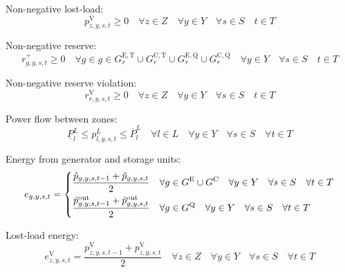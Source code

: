 \documentclass{article}
\newcommand{\sGeneratorsExisting}{G^{\mathrm{E}}}
\newcommand{\sGeneratorsExistingThermal}{G^{\mathrm{E,T}}}
\newcommand{\sGeneratorsCandidate}{G^{\mathrm{C}}}
\newcommand{\sGeneratorsCandidateThermal}{G^{\mathrm{C,T}}}
\newcommand{\sStorage}{G^{\mathrm{Q}}}
\newcommand{\sStorageExisting}{G^{\mathrm{E,Q}}}
\newcommand{\sStorageCandidate}{G^{\mathrm{C,Q}}}
\newcommand{\sYears}{Y}
\newcommand{\sScenarios}{S}
\newcommand{\sIntervals}{T}
\newcommand{\sZones}{Z}
\newcommand{\sLinks}{L}
\newcommand{\iGenerator}{g}
\newcommand{\iYear}{y}
\newcommand{\iScenario}{s}
\newcommand{\iInterval}{t}
\newcommand{\iZone}{z}
\newcommand{\iRegion}{r}
\newcommand{\iLink}{l}
\newcommand{\cPowerFlowMin}{\underline{P}_{\iLink}^{L}}
\newcommand{\cPowerFlowMax}{\overline{P}_{\iLink}^{L}}
\newcommand{\vEnergy}[1][\iGenerator,\iYear,\iScenario,\iInterval]{e_{#1}}
\newcommand{\vReserveUp}[1][\iGenerator,\iYear,\iScenario,\iInterval]{r^{+}_{#1}}
\newcommand{\vReserveUpViolation}[1][\iRegion,\iYear,\iScenario,\iInterval]{r^{\mathrm{V}}_{#1}}
\newcommand{\vPowerTotal}[1][\iGenerator,\iYear,\iScenario,\iInterval]{\hat{p}_{#1}}
\newcommand{\vPowerTotalOut}[1][\iGenerator,\iYear,\iScenario,\iInterval]{\hat{p}^{\mathrm{out}}_{#1}}
\newcommand{\vPowerFlow}[1][\iLink,\iYear,\iScenario,\iInterval]{p^{\sLinks}_{#1}}
\newcommand{\vLostLoadEnergy}[1][\iZone,\iYear,\iScenario,\iInterval]{e^{\mathrm{V}}_{#1}}
\newcommand{\vLostLoadPower}[1][\iZone,\iYear,\iScenario,\iInterval]{p^{\mathrm{V}}_{#1}}
\begin{document}
Non-negative lost-load:
\begin{equation}
\vLostLoadPower \geq 0 \quad \forall \iZone \in \sZones \quad \forall \iYear \in \sYears \quad \forall \iScenario \in \sScenarios \quad \iInterval \in \sIntervals
\end{equation}

Non-negative reserve:
\begin{equation}
\vReserveUp \geq 0 \quad \forall \iGenerator \in \iGenerator \in \sGeneratorsExistingThermal_{\iRegion} \cup \sGeneratorsCandidateThermal_{\iRegion} \cup \sStorageExisting_{\iRegion} \cup \sStorageCandidate_{\iRegion} \quad \forall \iYear \in \sYears \quad \forall \iScenario \in \sScenarios \quad \iInterval \in \sIntervals
\end{equation}

Non-negative reserve violation:
\begin{equation}
\vReserveUpViolation \geq 0 \quad \forall \iZone \in \sZones \quad \forall \iYear \in \sYears \quad \forall \iScenario \in \sScenarios \quad \iInterval \in \sIntervals
\end{equation}

Power flow between zones:
\begin{equation}
\cPowerFlowMin \leq \vPowerFlow \leq \cPowerFlowMax \quad \forall \iLink \in \sLinks \quad \forall \iYear \in \sYears \quad \forall \iScenario \in \sScenarios \quad \forall \iInterval \in \sIntervals
\label{eqn: powerflow constraints}
\end{equation}

Energy from generator and storage units:
\begin{equation}
\vEnergy = \begin{dcases}
\frac{\vPowerTotal[\iGenerator, \iYear,\iScenario,\iInterval-1] + \vPowerTotal}{2} & \forall \iGenerator \in \sGeneratorsExisting \cup \sGeneratorsCandidate \quad \forall \iYear \in \sYears \quad \forall \iScenario \in \sScenarios \quad \forall \iInterval \in \sIntervals\\
\frac{\vPowerTotalOut[\iGenerator, \iYear,\iScenario,\iInterval-1] + \vPowerTotalOut}{2} & \forall \iGenerator \in \sStorage \quad \forall \iYear \in \sYears \quad \forall \iScenario \in \sScenarios \quad \forall \iInterval \in \sIntervals\\
\end{dcases}
\end{equation}

Lost-load energy:
\begin{equation}
\vLostLoadEnergy = \frac{\vLostLoadPower[\iZone, \iYear,\iScenario,\iInterval-1] + \vLostLoadPower}{2} \quad \forall \iZone \in \sZones \quad \forall \iYear \in \sYears \quad \forall \iScenario \in \sScenarios \quad \forall \iInterval \in \sIntervals
\end{equation}
\end{document}
